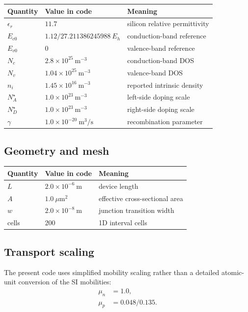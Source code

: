 \documentclass[11pt]{article}
\begin{document}
\begin{center}
\begin{tabular}{lll}
\toprule
Quantity & Value in code & Meaning \\
\midrule
$\epsilon_r$ & $11.7$ & silicon relative permittivity \\
$E_{c0}$ & $1.12/27.211386245988\ E_h$ & conduction-band reference \\
$E_{v0}$ & $0$ & valence-band reference \\
$N_c$ & $2.8 \times 10^{25}\ \mathrm{m}^{-3}$ & conduction-band DOS \\
$N_v$ & $1.04 \times 10^{25}\ \mathrm{m}^{-3}$ & valence-band DOS \\
$n_i$ & $1.45 \times 10^{16}\ \mathrm{m}^{-3}$ & reported intrinsic density \\
$N_A^\star$ & $1.0 \times 10^{23}\ \mathrm{m}^{-3}$ & left-side doping scale \\
$N_D^\star$ & $1.0 \times 10^{23}\ \mathrm{m}^{-3}$ & right-side doping scale \\
$\gamma$ & $1.0 \times 10^{-20}\ \mathrm{m}^{3}/\mathrm{s}$ & recombination parameter \\
\bottomrule
\end{tabular}
\end{center}

\subsection{Geometry and mesh}

\begin{center}
\begin{tabular}{lll}
\toprule
Quantity & Value in code & Meaning \\
\midrule
$L$ & $2.0 \times 10^{-6}\ \mathrm{m}$ & device length \\
$A$ & $1.0\ \mu\mathrm{m}^2$ & effective cross-sectional area \\
$w$ & $2.0 \times 10^{-8}\ \mathrm{m}$ & junction transition width \\
cells & $200$ & 1D interval cells \\
\bottomrule
\end{tabular}
\end{center}

\subsection{Transport scaling}

The present code uses simplified mobility scaling rather than a detailed atomic-unit
conversion of the SI mobilities:
\begin{align}
    \mu_n &= 1.0, \\
    \mu_p &= 0.048/0.135.
\end{align}
\end{document}
